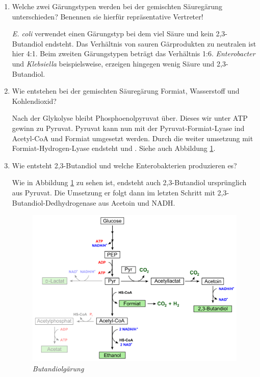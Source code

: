 \begin{enumerate}
	\item Welche zwei Gärungstypen werden bei der gemischten Säuregärung unterschieden? Benennen sie hierfür repräsentative Vertreter!
	
		\emph{E. coli} verwendet einen Gärungstyp bei dem viel Säure und kein 2,3-Butandiol endsteht.
		Das Verhältnis von sauren Gärprodukten zu neutralen ist hier 4:1.
		Beim  zweiten Gärungstypen beträgt das Verhältnis 1:6.
		\emph{Enterobacter} und \emph{Klebsiella} beispielsweise,
		erzeigen hingegen wenig Säure und 2,3-Butandiol.

	\item Wie entstehen bei der gemischten Säuregärung Formiat, Wasserstoff und Kohlendioxid?
		
		Nach der Glykolyse bleibt Phosphoenolpyruvat über.
		Dieses wir unter ATP gewinn zu Pyruvat.
		Pyruvat kann nun mit der Pyruvat-Formiat-Lyase ind Acetyl-CoA und Formiat umgesetzt werden.
		Durch die weiter umsetzung mit Formiat-Hydrogen-Lyase endsteht  und .
		Siehe auch Abbildung \ref{fig:butandiolgaerung}.

	\item Wie entsteht 2,3-Butandiol und welche Enterobakterien produzieren es?

		Wie in Abbildung \ref{fig:butandiolgaerung} zu sehen ist,
		endsteht auch 2,3-Butandiol ursprünglich aus Pyruvat.
		Die Umsetzung er folgt dann im letzten Schritt mit 2,3-Butandiol-Dedhydrogenase
		aus Acetoin und NADH.
		
		\begin{figure}[ht]
		\leavevmode
		\begin{center}
		\includegraphics[scale=0.32]{./pictures/butandiolgaerung_1000}
		\end{center}
		\caption{\slshape{Butandiolgärung}}
		\label{fig:butandiolgaerung}
		\end{figure}


\end{enumerate}
